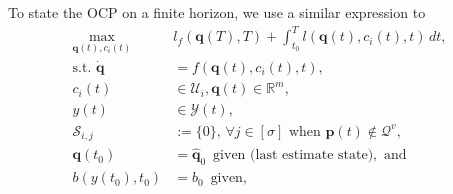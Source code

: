 
To state the OCP on a finite horizon, we use a similar expression to  
\begin{subequations}\label{eq:ocp-output-mpc}\begin{align}
  \max_{\mathbf{q}(t),c_i(t)}&{l_f(\mathbf{q}(T),T)+\int_{t_0}^T{l(\mathbf{q}(t),c_i(t),t)\,dt}},\\
  \text{s.t. }\dot{\mathbf{q}}&=f(\mathbf{q}(t),c_i(t),t),\label{eq:dyn-evol}\\
  c_i(t)&\in\mathcal{U}_i,\mathbf{q}(t)\in\mathbb{R}^m,\label{eq:state-cont-const-mpc}\\
  y(t)&\in\mathcal{Y}(t),\label{eq:batt-const-mpc}\\
  \mathcal{S}_{i,j}&:=\{0\},\,\forall j \in [\sigma]\text{ when }\mathbf{p}(t)\notin\mathcal{Q}^v,\label{eq:polyg-const}\\
  \mathbf{q}(t_0)&=\hat{\mathbf{q}}_0\,\,\,\text{given (last estimate state)},\text{ and}\\
  b(y(t_0),t_0)&=b_0\,\,\,\text{given},
\end{align}\end{subequations}
